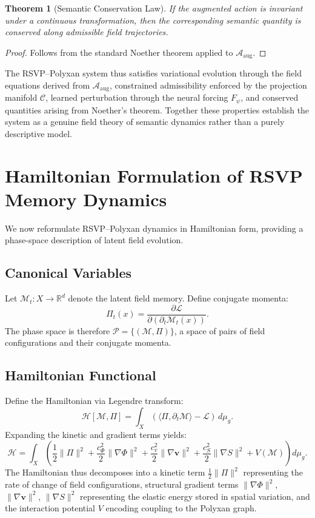 \documentclass[11pt]{article}
\newtheorem{theorem}{Theorem}[section]
\begin{document}
\begin{theorem}[Semantic Conservation Law]
If the augmented action is invariant under a continuous transformation,
then the corresponding semantic quantity is conserved along admissible
field trajectories.
\end{theorem}

\begin{proof}
Follows from the standard Noether theorem applied to
$\mathcal{A}_{\text{aug}}$.
\end{proof}

The RSVP--Polyxan system thus satisfies variational evolution through
the field equations derived from $\mathcal{A}_{\text{aug}}$, constrained
admissibility enforced by the projection manifold $\mathcal{C}$, learned
perturbation through the neural forcing $F_\psi$, and conserved quantities
arising from Noether's theorem.
Together these properties establish the system as a genuine field theory
of semantic dynamics rather than a purely descriptive model.

\section{Hamiltonian Formulation of RSVP Memory Dynamics}

We now reformulate RSVP--Polyxan dynamics in Hamiltonian form, providing
a phase-space description of latent field evolution.

\subsection{Canonical Variables}

Let $\mathcal{M}_t : X \to \mathbb{R}^d$ denote the latent field memory.
Define conjugate momenta:
\[
\Pi_t(x) = \frac{\partial \mathcal{L}}{\partial (\partial_t \mathcal{M}_t(x))}.
\]
The phase space is therefore $\mathcal{P} = \{(\mathcal{M}, \Pi)\}$,
a space of pairs of field configurations and their conjugate momenta.

\subsection{Hamiltonian Functional}

Define the Hamiltonian via Legendre transform:
\[
\mathcal{H}[\mathcal{M}, \Pi]
=
\int_X
\left(
\langle \Pi, \partial_t \mathcal{M} \rangle - \mathcal{L}
\right)
\, d\mu_g.
\]
Expanding the kinetic and gradient terms yields:
\[
\mathcal{H}
=
\int_X
\left(
\frac{1}{2}\|\Pi\|^2
+
\frac{c_\Phi^2}{2}\|\nabla \Phi\|^2
+
\frac{c_v^2}{2}\|\nabla \mathbf{v}\|^2
+
\frac{c_S^2}{2}\|\nabla S\|^2
+
V(\mathcal{M})
\right)
d\mu_g.
\]
The Hamiltonian thus decomposes into a kinetic term $\frac{1}{2}\|\Pi\|^2$
representing the rate of change of field configurations, structural gradient
terms $\|\nabla\Phi\|^2$, $\|\nabla\mathbf{v}\|^2$, $\|\nabla S\|^2$
representing the elastic energy stored in spatial variation, and the
interaction potential $V$ encoding coupling to the Polyxan graph.
\end{document}
